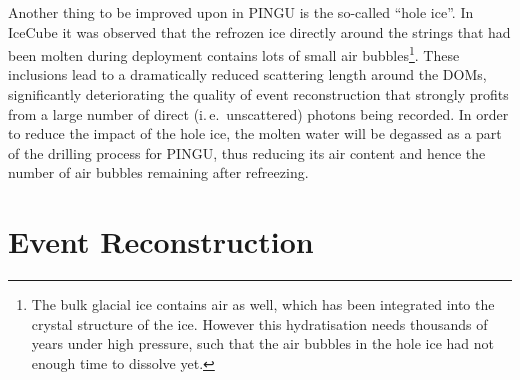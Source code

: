 Another thing to be improved upon in PINGU is the so-called ``hole ice''. In 
IceCube it was observed that the refrozen ice directly around the strings that 
had been molten during deployment contains lots of small air
bubbles\footnote{The bulk glacial ice contains air as well, which has been
integrated into the crystal structure of the ice. However this hydratisation
needs thousands of years under high pressure, such that the air bubbles in the
hole ice had not enough time to dissolve yet.}. These
inclusions lead to a dramatically reduced scattering length around the DOMs,
significantly deteriorating the quality of event reconstruction that strongly
profits from a large number of direct (i.\,e.\ unscattered) photons being
recorded. In order to reduce the impact of the hole ice, the molten water will
be degassed as a part of the drilling process for PINGU, thus reducing its air
content and hence the number of air bubbles remaining after refreezing.

\section{Event Reconstruction}
\label{sec:EvtReco}

